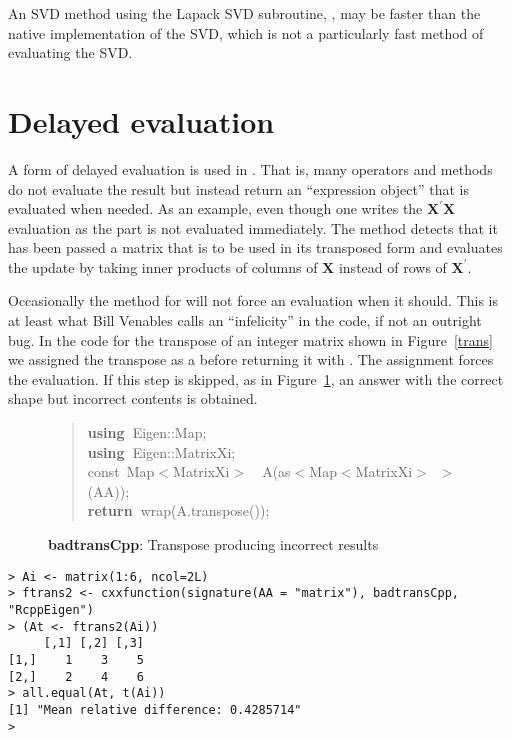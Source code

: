 \documentclass[shortnames,article]{jss}
\newcommand{\hlstd}[1]{\textcolor[rgb]{0,0,0}{#1}}
\newcommand{\hlopt}[1]{\textcolor[rgb]{0,0,0}{#1}}
\newcommand{\hlkwa}[1]{\textcolor[rgb]{0.61,0.13,0.93}{\bf{#1}}}
\newcommand{\hlkwb}[1]{\textcolor[rgb]{0.13,0.54,0.13}{#1}}
\newcommand{\hlkwd}[1]{\textcolor[rgb]{0,0,0}{#1}}
\begin{document}
An SVD method using the Lapack SVD subroutine, , may be
faster than the native  implementation of the SVD, which is
not a particularly fast method of evaluating the SVD.

\section{Delayed evaluation}
\label{sec:delayed}

A form of delayed evaluation is used in .  That is, many
operators and methods do not evaluate the result but instead return an
``expression object'' that is evaluated when needed.  As an example,
even though one writes the $\bm X^\prime\bm X$ evaluation as
 the  part is not
evaluated immediately.  The  method detects that it
has been passed a matrix that is to be used in its transposed form and
evaluates the update by taking inner products of columns of $\bm X$
instead of rows of $\bm X^\prime$.

Occasionally the method for  will not force an
evaluation when it should.  This is at least what Bill Venables calls
an ``infelicity'' in the code, if not an outright bug.  In the code
for the transpose of an integer matrix shown in Figure~\ref{trans} we
assigned the transpose as a  before returning it with
.  The assignment forces the evaluation.  If this
step is skipped, as in Figure~\ref{badtrans}, an answer with the correct
shape but incorrect contents is obtained.

\begin{figure}[htb]
  \begin{quote}
    \noindent
    \ttfamily
    \hlstd{}\hlkwa{using\ }\hlstd{Eigen}\hlopt{::}\hlstd{Map}\hlopt{;}\hspace*{\fill}\\
    \hlstd{}\hlkwa{using\ }\hlstd{Eigen}\hlopt{::}\hlstd{MatrixXi}\hlopt{;}\hspace*{\fill}\\
    \hlstd{}\hlkwb{const\ }\hlstd{Map}\hlopt{$<$}\hlstd{MatrixXi}\hlopt{$>$}\hlstd{\ \ }\hlopt{}\hlstd{}\hlkwd{A}\hlstd{}\hlopt{(}\hlstd{as}\hlopt{$<$}\hlstd{Map}\hlopt{$<$}\hlstd{MatrixXi}\hlopt{$>$\ $>$(}\hlstd{AA}\hlopt{));}\hspace*{\fill}\\
    \hlstd{}\hlkwa{return\ }\hlstd{}\hlkwd{wrap}\hlstd{}\hlopt{(}\hlstd{A}\hlopt{.}\hlstd{}\hlkwd{transpose}\hlstd{}\hlopt{());}\hlstd{}\hspace*{\fill}
    \normalfont
    \normalsize
  \end{quote}
  \caption{\textbf{badtransCpp}: Transpose producing incorrect results}
  \label{badtrans}
\end{figure}
\begin{verbatim}
> Ai <- matrix(1:6, ncol=2L)
> ftrans2 <- cxxfunction(signature(AA = "matrix"), badtransCpp, "RcppEigen")
> (At <- ftrans2(Ai))
     [,1] [,2] [,3]
[1,]    1    3    5
[2,]    2    4    6
> all.equal(At, t(Ai))
[1] "Mean relative difference: 0.4285714"
> 
\end{verbatim}
\end{document}

